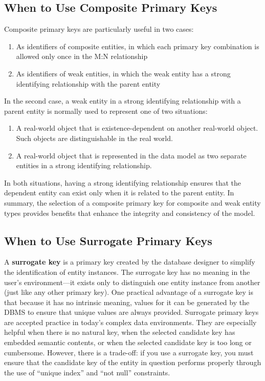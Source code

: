 \documentclass[a4paper, 12pt, titlepage]{report}
\begin{document}
{\subsection{When to Use Composite Primary Keys}
Composite primary keys are particularly useful in two cases:
\begin{enumerate}
\item As identifiers of composite entities, in which each primary key combination is allowed only once in the M:N relationship
\item As identifiers of weak entities, in which the weak entity has a strong identifying relationship with the parent entity
\end{enumerate}
In the second case, a weak entity in a strong identifying relationship with a parent entity is normally used to represent one of two situations:
\begin{enumerate}
\item A real-world object that is existence-dependent on another real-world object. Such objects are distinguishable in the real world.
\item A real-world object that is represented in the data model as two separate entities in a strong identifying relationship.
\end{enumerate}
In both situations, having a strong identifying relationship ensures that the dependent entity can exist only when it is related to the parent entity. In summary, the selection
of a composite primary key for composite and weak entity types provides benefits that enhance the integrity and consistency of the model.
\subsection{When to Use Surrogate Primary Keys}
A \textbf{surrogate key} is a primary key created by the database designer to simplify the identification of entity instances. The surrogate key has no meaning in the user’s environment—it exists only to distinguish one entity instance from another (just like any other primary key). One practical advantage of a surrogate key is that because it has no intrinsic meaning, values for it can be generated by the DBMS to ensure that unique values are always provided. Surrogate primary keys are accepted practice in today’s complex data environments. They are especially helpful when there is no natural key, when the selected candidate key has embedded semantic contents, or when the selected candidate key is too long or cumbersome. However, there is a trade-off: if you use a surrogate key, you must ensure that the candidate key of the entity in question performs properly through the use of “unique index” and “not null” constraints.
}
\end{document}
